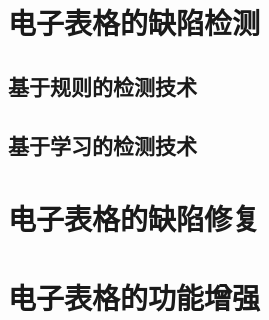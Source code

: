 \section{电子表格的缺陷检测}


\subsection{基于规则的检测技术}


\subsection{基于学习的检测技术}



\section{电子表格的缺陷修复}


\section{电子表格的功能增强}